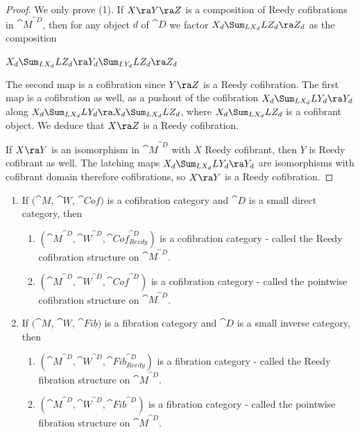 \begin{proof}
We only prove (1). If $X \ra Y \ra Z$ is a composition of Reedy cofibrations in ${\cat M}^{\cat D}$, then for any object $d$ of ${\cat D}$ we factor $X_d \Sum_{LX_d} LZ_d \ra Z_d$ as the composition 
\begin{center}
$X_d \Sum_{LX_d} LZ_d \ra Y_d \Sum_{LY_d} LZ_d \ra Z_d$
\end{center}
The second map is a cofibration since $Y \ra Z$ is a Reedy cofibration. The first map is a cofibration as well, as a pushout of the cofibration $X_d \Sum_{LX_d} LY_d \ra Y_d$ along $X_d \Sum_{LX_d} LY_d \ra X_d \Sum_{LX_d} LZ_d$, where $X_d \Sum_{LX_d} LZ_d$ is a cofibrant object. We deduce that $X \ra Z$ is a Reedy cofibration.

If $X \ra Y$ is an isomorphism in ${\cat M}^{\cat D}$ with $X$ Reedy cofibrant, then $Y$ is Reedy cofibrant as well. The latching maps $X_d \Sum_{LX_d} LY_d \ra Y_d$ are isomorphisms with cofibrant domain therefore cofibrations, so $X\ra Y$ is a Reedy cofibration.
\end{proof}

\begin{thm}
\label{thm:reedycofibstruct}
\mbox{}
\begin{enumerate}
\item
If $({\cat M}$, ${\cat W}$, ${\cat Cof})$ is a cofibration category and ${\cat D}$ is a small direct category, then
\begin{enumerate}
\item
$({\cat M}^{\cat D}, {\cat W}^{\cat D}, {\cat Cof}^{\cat D}_{Reedy})$ is a cofibration category - called the Reedy cofibration structure on ${\cat M}^{\cat D}$.
\item
$({\cat M}^{\cat D}, {\cat W}^{\cat D}, {\cat Cof}^{\cat D})$ is a cofibration category - called the pointwise cofibration structure on ${\cat M}^{\cat D}$.
\end{enumerate}
\item
If $({\cat M}$, ${\cat W}$, ${\cat Fib})$ is a fibration category and ${\cat D}$ is a small inverse category, then
\begin{enumerate}
\item
$({\cat M}^{\cat D}, {\cat W}^{\cat D}, {\cat Fib}^{\cat D}_{Reedy})$ is a fibration category - called the Reedy fibration structure on ${\cat M}^{\cat D}$.
\item
$({\cat M}^{\cat D}, {\cat W}^{\cat D}, {\cat Fib}^{\cat D})$ is a fibration category - called the pointwise fibration structure on ${\cat M}^{\cat D}$.
\end{enumerate}
\end{enumerate}
\end{thm}

